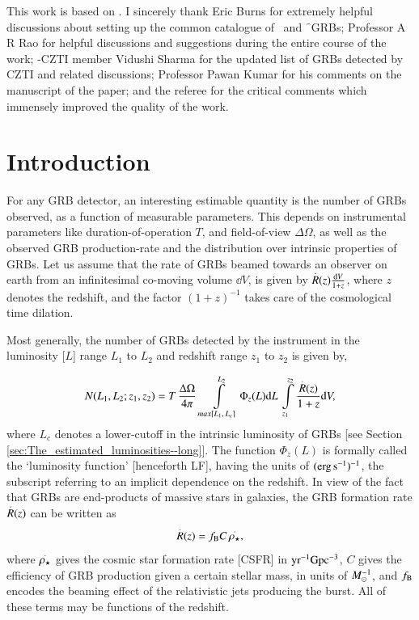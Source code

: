 \begin{checkit}
This work is based on \cite{Paul-2018-MNRAS--long}. I sincerely thank Eric Burns for extremely helpful discussions about setting up the common catalogue of \s\ and \f\ GRBs; Professor A R Rao for helpful discussions and suggestions during the entire course of the work; \AS -CZTI member Vidushi Sharma for the updated list of GRBs detected by CZTI and related discussions; Professor Pawan Kumar for his comments on the manuscript of the paper; and the referee for the critical comments which immensely improved the quality of the work.
\end{checkit}



\section{Introduction}
\label{sec:introduction--LGRBs}
For any GRB detector, an interesting estimable quantity is the number of GRBs observed, as a function of measurable parameters. This depends on instrumental parameters like duration-of-operation $T$, and field-of-view $\Delta \Omega$, as well as the observed GRB production-rate and the distribution over intrinsic properties of GRBs. Let us assume that the rate of GRBs beamed towards an observer on earth from an infinitesimal co-moving volume $\dd V$, is given by $\overset{.}{R} (z) \frac{{\rm d} V}{1+z}$, where $z$ denotes the redshift, and the factor $(1+z)^{-1}$ takes care of the cosmological time dilation.

Most generally, the number of GRBs detected by the instrument in the luminosity [$L$] range $L_1$ to $L_2$ and redshift range $z_1$ to $z_2$ is given by,

\begin{equation}
N(L_1,L_2; z_1,z_2) = T \, \dfrac{\Delta \Omega}{4 \pi} \, \intop_{max[L_1, \, L_c]}^{L_2} \Phi_z(L) \dd L \, \intop_{z_1}^{z_2} \dfrac{ \Rdot(z) }{1+z} \dd V,
\label{eq:definition_of_phi}
\end{equation} where $L_c$ denotes a lower-cutoff in the intrinsic luminosity of GRBs [see Section \ref{sec:The_estimated_luminosities--long}]. The function $\Phi_z(L)$ is formally called the `luminosity function' [henceforth LF], having the units of $(\rm erg \, s^{-1})^{-1}$, the subscript referring to an implicit dependence on the redshift. In view of the fact that GRBs are end-products of massive stars in galaxies, the GRB formation rate $\overset{.}{R}(z)$ can be written as
\begin{equation}
\overset{.}{R}(z) = f_{\rm{B}} C\, \overset{.}{\rho_{\star}},
\label{eq:R_dot--long}
\end{equation} where $\overset{.}{\rho_{\star}}$ gives the cosmic star formation rate [CSFR] in $ {\rm yr^{-1}Gpc^{-3}}$, $C$ gives the efficiency of GRB production given a certain stellar mass, in units of $M_{\odot}^{-1}$, and $f_{\rm{B}}$ encodes the beaming effect of the relativistic jets producing the burst. All of these terms may be functions of the redshift.

